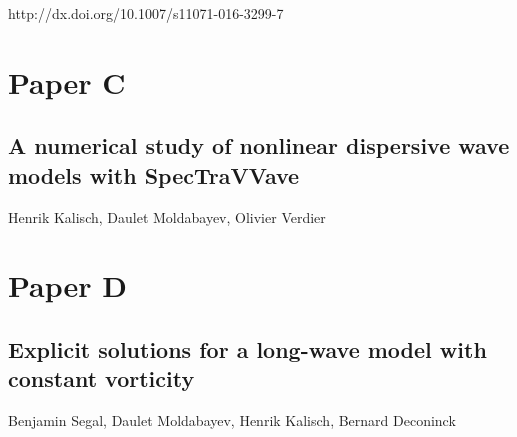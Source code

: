\noindent http://dx.doi.org/10.1007/s11071-016-3299-7

\cleardoublepage



\chapter*{Paper C}

\section*{A numerical study of nonlinear dispersive wave models with SpecTraVVave}

\noindent Henrik Kalisch, Daulet Moldabayev, Olivier Verdier\\

\cleardoublepage




\chapter*{Paper D}

\section*{Explicit solutions for a long-wave model with constant vorticity}

\noindent Benjamin Segal, Daulet Moldabayev, Henrik Kalisch, Bernard Deconinck\\

\cleardoublepage

